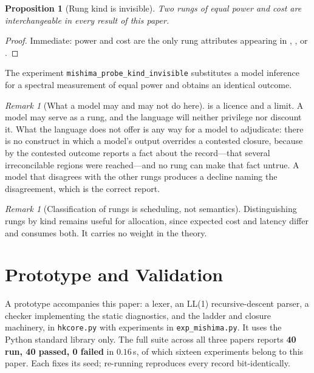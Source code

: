 \documentclass[11pt,twocolumn,a4paper]{article}
\newtheorem{proposition}[theorem]{Proposition}
\theoremstyle{definition}
\theoremstyle{remark}
\newtheorem{remark}[theorem]{Remark}
\begin{document}
\begin{proposition}[Rung kind is invisible]
\label{prop:kind-invisible}
Two rungs of equal power and cost are interchangeable in every result of this
paper.
\end{proposition}

\begin{proof}
Immediate: power and cost are the only rung attributes appearing in
, ,  or
.
\end{proof}

The experiment \texttt{mishima\_probe\_kind\_invisible} substitutes a model
inference for a spectral measurement of equal power and obtains an identical
outcome.

\begin{remark}[What a model may and may not do here]
\label{rem:model-bounded}
 is a licence and a limit. A model may serve as a rung,
and the language will neither privilege nor discount it. What the language does
not offer is any way for a model to adjudicate: there is no construct in which a
model's output overrides a contested closure, because by  the
contested outcome reports a fact about the record---that several irreconcilable
regions were reached---and no rung can make that fact untrue. A model that
disagrees with the other rungs produces a decline naming the disagreement, which
is the correct report.
\end{remark}

\begin{remark}[Classification of rungs is scheduling, not semantics]
\label{rem:kind-scheduling}
Distinguishing rungs by kind remains useful for allocation, since expected cost
and latency differ and  consumes both. It carries no weight
in the theory.
\end{remark}

\section{Prototype and Validation}
\label{sec:validation}

A prototype accompanies this paper: a lexer, an LL(1) recursive-descent parser, a
checker implementing the static diagnostics, and the ladder and closure
machinery, in \texttt{hkcore.py} with experiments in \texttt{exp\_mishima.py}. It
uses the Python standard library only. The full suite across all three papers
reports \textbf{40 run, 40 passed, 0 failed} in $0.16$\,s, of which sixteen
experiments belong to this paper. Each fixes its seed; re-running reproduces
every record bit-identically.
\end{document}
